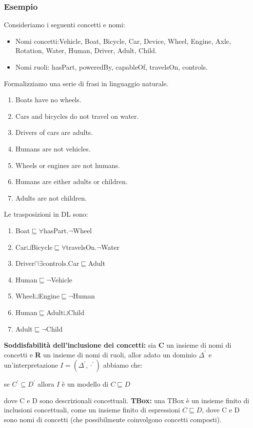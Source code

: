 \documentclass[../main.tex]{subfiles}
\begin{document}
   \subsubsection{Esempio}
   Consideriamo i seguenti concetti e nomi:
   \begin{itemize}
      \item Nomi concetti:Vehicle, Boat, Bicycle, Car, Device, Wheel, Engine, Axle, Rotation, Water, Human, Driver, Adult, Child.
      \item Nomi ruoli: hasPart, poweredBy, capableOf, travelsOn, controls.
   \end{itemize}
   Formalizziamo una serie di frasi in linguaggio naturale.
   \begin{enumerate}
      \item Boats have no wheels.
      \item Cars and bicycles do not travel on water.
      \item Drivers of cars are adults.
      \item Humans are not vehicles.
      \item Wheels or engines are not humans.
      \item Humans are either adults or children.
      \item Adults are not children.
   \end{enumerate}
   Le trasposizioni in DL sono:
   \begin{enumerate}
      \item Boat$\sqsubseteq \forall$hasPart.$\lnot$Wheel
      \item Car$\sqcup$Bicycle$\sqsubseteq \forall$travelsOn.$\lnot$Water
      \item Driver$\sqcap \exists$controls.Car$\sqsubseteq$Adult
      \item Human$\sqsubseteq \lnot$Vehicle
      \item Wheel$\sqcup$Engine$\sqsubseteq \lnot$Human
      \item Human$\sqsubseteq$Adult$\sqcup$Child
      \item Adult$\sqsubseteq \lnot$Child
   \end{enumerate}
   \vspace{2em}
   \textbf{Soddisfabilità dell'inclusione dei concetti:} sia \textbf{C} un insieme di nomi di concetti e \textbf{R} un insieme di nomi di ruoli, allor adato un dominio $\Delta^\prime$ e un'interpretazione $I = (\Delta^\prime, \cdot^\prime)$ abbiamo che:
   \begin{center}
      se $C^\prime \subseteq D^\prime$ allora $I$ è un modello di $C \sqsubseteq D$
   \end{center}
   dove C e D sono descrizionali concettuali.
   \spazio
   \textbf{TBox:} una TBox è un insieme finito di inclusioni concettuali, come un insieme finito di espressioni $C \sqsubseteq D$, dove C e D sono nomi di concetti (che possibilmente coinvolgono concetti composti).
   
\end{document}
